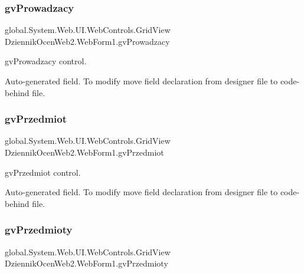 \subsubsection{\texorpdfstring{gv\+Prowadzacy}{gvProwadzacy}}
{\footnotesize\ttfamily global.\+System.\+Web.\+U\+I.\+Web\+Controls.\+Grid\+View Dziennik\+Ocen\+Web2.\+Web\+Form1.\+gv\+Prowadzacy\hspace{0.3cm}{\ttfamily [protected]}}



gv\+Prowadzacy control. 

Auto-\/generated field. To modify move field declaration from designer file to code-\/behind file. \mbox{\label{class_dziennik_ocen_web2_1_1_web_form1_a33d6314fc2cc5c707fbc53f0ce93908e}} 
\subsubsection{\texorpdfstring{gv\+Przedmiot}{gvPrzedmiot}}
{\footnotesize\ttfamily global.\+System.\+Web.\+U\+I.\+Web\+Controls.\+Grid\+View Dziennik\+Ocen\+Web2.\+Web\+Form1.\+gv\+Przedmiot\hspace{0.3cm}{\ttfamily [protected]}}



gv\+Przedmiot control. 

Auto-\/generated field. To modify move field declaration from designer file to code-\/behind file. \mbox{\label{class_dziennik_ocen_web2_1_1_web_form1_ab823c042dbbcc237618e27b8734413cb}} 
\subsubsection{\texorpdfstring{gv\+Przedmioty}{gvPrzedmioty}}
{\footnotesize\ttfamily global.\+System.\+Web.\+U\+I.\+Web\+Controls.\+Grid\+View Dziennik\+Ocen\+Web2.\+Web\+Form1.\+gv\+Przedmioty\hspace{0.3cm}{\ttfamily [protected]}}



